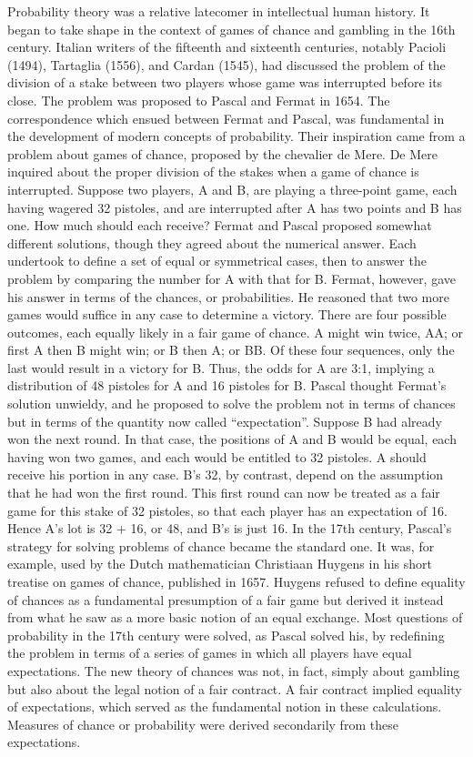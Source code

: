 Probability theory was a relative latecomer in intellectual human history. It began to take shape in the context of games of chance and gambling in the 16th century. Italian writers of the fifteenth and sixteenth centuries, notably Pacioli (1494), Tartaglia (1556), and Cardan (1545), had discussed the problem of the division of a stake between two players whose game was interrupted before its close. The problem was proposed to Pascal and Fermat in 1654. The correspondence which ensued between Fermat and Pascal, was fundamental in the development of modern concepts of probability. Their inspiration came from a problem about games of chance, proposed by the chevalier de Mere. De Mere inquired about the proper division of the stakes when a game of chance is interrupted. Suppose two players, A and B, are playing a three-point game, each having wagered 32 pistoles, and are interrupted after A has two points and B has one. How much should each receive? Fermat and Pascal proposed somewhat different solutions, though they agreed about the numerical answer. Each undertook to define a set of equal or symmetrical cases, then to answer the problem by comparing the number for A with that for B. Fermat, however, gave his answer in terms of the chances, or probabilities. He reasoned that two more games would suffice in any case to determine a victory. There are four possible outcomes, each equally likely in a fair game of chance. A might win twice, AA; or first A then B might win; or B then A; or BB. Of these four sequences, only the last would result in a victory for B. Thus, the odds for A are 3:1, implying a distribution of 48 pistoles for A and 16 pistoles for B.\newline
Pascal thought Fermat's solution unwieldy, and he proposed to solve the problem not in terms of chances but in terms of the quantity now called “expectation”. Suppose B had already won the next round. In that case, the positions of A and B would be equal, each having won two games, and each would be entitled to 32 pistoles. A should receive his portion in any case. B's 32, by contrast, depend on the assumption that he had won the first round. This first round can now be treated as a fair game for this stake of 32 pistoles, so that each player has an expectation of 16. Hence A's lot is 32 + 16, or 48, and B's is just 16.\newline
In the 17th century, Pascal's strategy for solving problems of chance became the standard one. It was, for example, used by the Dutch mathematician Christiaan Huygens in his short treatise on games of chance, published in 1657. Huygens refused to define equality of chances as a fundamental presumption of a fair game but derived it instead from what he saw as a more basic notion of an equal exchange. Most questions of probability in the 17th century were solved, as Pascal solved his, by redefining the problem in terms of a series of games in which all players have equal expectations. The new theory of chances was not, in fact, simply about gambling but also about the legal notion of a fair contract. A fair contract implied equality of expectations, which served as the fundamental notion in these calculations. Measures of chance or probability were derived secondarily from these expectations.\newline
